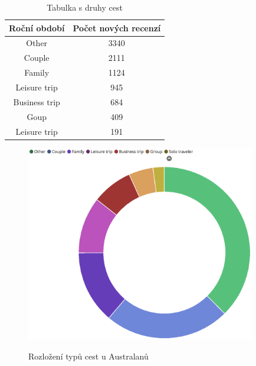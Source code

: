 \documentclass[czech,BP]{thesiskiv}
\begin{document}
\begin{table}[h]
	\centering
	
	\begin{tabular}{|c|c|}
		\hline
		\multicolumn{1}{|l|}{\textbf{Roční období}} & \multicolumn{1}{l|}{\textbf{Počet nových recenzí}} \\ \hline
		Other                                        &  3340                                              \\ \hline
		Couple                                        &  2111                                            \\ \hline
		Family                                        &  1124                                              \\ \hline
		Leisure trip                                      &  945                                              \\ \hline
		Business trip                                      &  684                                              \\ \hline
		Goup                                      &  409                                              \\ \hline
		Leisure trip                                      &  191                                              \\ \hline
	\end{tabular}
\caption{Tabulka s druhy cest}
\end{table}
\begin{figure} [h]
	\centering
	\includegraphics[width=10cm]{img/australia.eps}
	\label{Rozložení typů cest u Australanů}
	\caption{Rozložení typů cest u Australanů}
\end{figure}
\\
\end{document}
